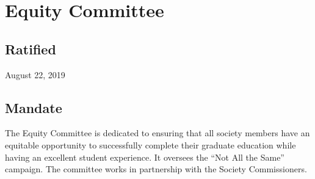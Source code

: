 \section{Equity Committee}

\subsection{Ratified}
August 22, 2019

\subsection{Mandate}
The Equity Committee is dedicated to ensuring that all society members have an equitable opportunity to successfully complete their graduate education while having an excellent student experience. It oversees the “Not All the Same” campaign. The committee works in partnership with the Society Commissioners.


